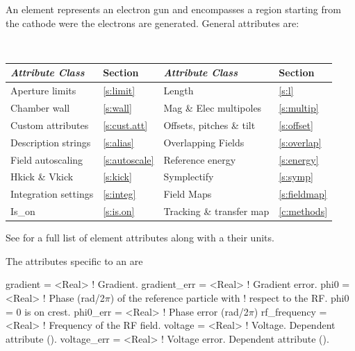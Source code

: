 An  element represents an electron gun and encompasses a
region starting from the cathode were the electrons are generated.
General  attributes are:
\begin{center}
\tt
\begin{tabular}{llll} \toprule
  {\sl Attribute Class}      & Section           & {\sl Attribute Class}      & Section           \\ \midrule
  Aperture limits            & \ref{s:limit}     & Length                     & \ref{s:l}         \\
  Chamber wall               & \ref{s:wall}      & Mag \& Elec multipoles     & \ref{s:multip}    \\
  Custom attributes          & \ref{s:cust.att}  & Offsets, pitches \& tilt   & \ref{s:offset}    \\ 
  Description strings        & \ref{s:alias}     & Overlapping Fields         & \ref{s:overlap}   \\
  Field autoscaling          & \ref{s:autoscale} & Reference energy           & \ref{s:energy}    \\ 
  Hkick \& Vkick             & \ref{s:kick}      & Symplectify                & \ref{s:symp}      \\
  Integration settings       & \ref{s:integ}     & Field Maps                 & \ref{s:fieldmap}  \\
  Is_on                      & \ref{s:is.on}     & Tracking \& transfer map   & \ref{c:methods}   \\ 
  \bottomrule
\end{tabular}
\end{center}
\toffset
See  for a full list of element attributes along with a their units.

The attributes specific to an  are 
\begin{example}
  gradient       = <Real>    ! Gradient.
  gradient_err   = <Real>    ! Gradient error.
  phi0           = <Real>    ! Phase (rad/2\(\pi\)) of the reference particle with 
                             !   respect to the RF. phi0 = 0 is on crest.
  phi0_err       = <Real>    ! Phase error (rad/2\(\pi\))
  rf_frequency   = <Real>    ! Frequency of the RF field.
  voltage        = <Real>    ! Voltage. Dependent attribute (). 
  voltage_err    = <Real>    ! Voltage error. Dependent attribute (). 
\end{example}


